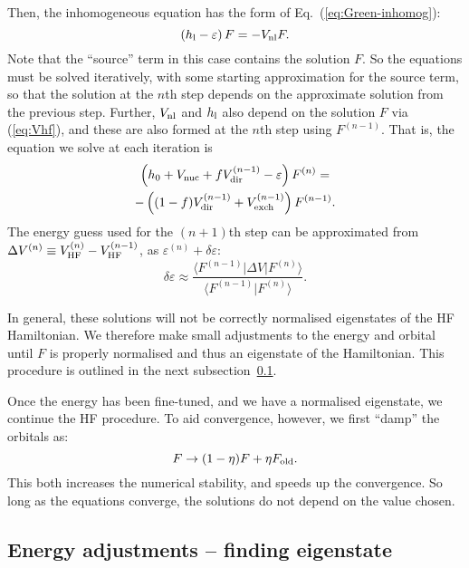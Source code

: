 \documentclass[10pt,twocolumn,a4paper]{article}%
\newcommand{\bra}[1]{\ensuremath{\langle #1|}}	%
\newcommand{\ket}[1]{\ensuremath{|#1\rangle}}
\newcommand{\braket}[1]{\ensuremath{\langle #1\rangle}}	%
\newcommand{\be}{\begin{equation}}
\newcommand{\ee}{\end{equation}}
\def\en{\ensuremath{\varepsilon}}
\begin{document}
Then, the inhomogeneous equation has the form of Eq.~(\ref{eq:Green-inhomog}):
\be
\left( h_{\rm l}- \en\right)F = -V_{\rm nl}F.
\ee
Note that the ``source'' term in this case contains the solution $F$. 
So the equations must be solved iteratively, with some starting approximation for the source term, so that the solution at the $n$th step depends on the approximate solution from the previous step.
Further, $V_{\rm nl}$ and $h_{\rm l}$ also depend on the solution $F$ via (\ref{eq:Vhf}), and these are also formed at the $n$th step using $F^{(n-1)}$.
That is, the equation we solve at each iteration is
\begin{multline}\label{eq:inhomog-HF}
\left( h_0 + V_{\rm nuc} + fV_{\rm dir}^{(n-1)} - \en\right)F^{(n)} =
\\
 -\left( (1-f)V_{\rm dir}^{(n-1)}+V_{\rm exch}^{(n-1)} \right)F^{(n-1)}.
\end{multline}
%
The energy guess used for the $(n+1)$th step can be approximated from $\Delta V^{(n)} \equiv V_{\rm HF}^{(n)} - V_{\rm HF}^{(n-1)}$, as $\en^{(n)}+\delta\en$:
\be
\delta\en \approx  \frac{\bra{F^{(n-1)}} \Delta V \ket{F^{(n)}}}{\braket{F^{(n-1)}|F^{(n)}}}.
\ee


In general, these solutions will not be correctly normalised eigenstates of the HF Hamiltonian.
We therefore make small adjustments to the energy and orbital until $F$ is properly normalised and thus an eigenstate of the Hamiltonian. 
This procedure is outlined in the next subsection~\ref{sec:hf-adjustEn}.

Once the energy has been fine-tuned, and we have a normalised eigenstate, we continue the HF procedure.
To aid convergence, however, we first ``damp'' the orbitals as:
\be
F \to (1-\eta)F+ \eta F_{\rm old}.
\ee
This both increases the numerical stability, and speeds up the convergence. 
So long as the equations converge, the solutions do not depend on the value chosen.



\subsection{Energy adjustments -- finding eigenstate}\label{sec:hf-adjustEn}
\end{document}
